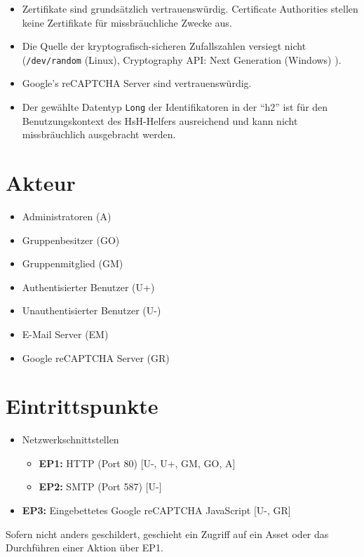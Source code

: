 \documentclass[fontsize=12pt,DIV=14,BCOR=10mm,a4paper,parskip=half-,ngerman,english,bibliography=totocnumbered]{scrreprt}
\begin{document}
\begin{itemize}
  \item Zertifikate sind grundsätzlich vertrauenswürdig. Certificate Authorities stellen keine Zertifikate für missbräuchliche Zwecke aus.
  \item Die Quelle der kryptografisch-sicheren Zufallszahlen versiegt nicht (\texttt{/dev/random} (Linux), Cryptography API: Next Generation (Windows) \autocite{Windows.SecureRandom}).
  \item Google's reCAPTCHA Server sind vertrauenswürdig.
  \item Der gewählte Datentyp \texttt{Long} der Identifikatoren in der \enquote{h2} ist für den Benutzungskontext des HsH-Helfers ausreichend und kann nicht missbräuchlich ausgebracht werden.
\end{itemize}

\chapter{Akteur}

\begin{itemize}
  \item Administratoren (A)
  \item Gruppenbesitzer (GO)
  \item Gruppenmitglied (GM)
  \item Authentisierter Benutzer (U+)
  \item Unauthentisierter Benutzer (U-)
  \item E-Mail Server (EM)
  \item Google reCAPTCHA Server (GR)
\end{itemize}

\chapter{Eintrittspunkte}

\begin{itemize}
  \item Netzwerkschnittstellen
  \begin{itemize}
    \item \textbf{EP1:} HTTP (Port 80)  [U-, U+, GM, GO, A]
    \item \textbf{EP2:} SMTP (Port 587) [U-]
  \end{itemize}
  \item \textbf{EP3:} Eingebettetes Google reCAPTCHA JavaScript [U-, GR]
\end{itemize}

Sofern nicht anders geschildert, geschieht ein Zugriff auf ein Asset oder das Durchführen einer Aktion über EP1.
\end{document}
